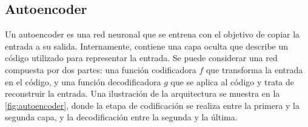 \subsection{Autoencoder}\label{sec:autoencoder}

Un autoencoder es una red neuronal que se entrena con el objetivo de copiar la entrada a su salida. Internamente, contiene una capa oculta que describe un código utilizado para representar la entrada. Se puede considerar una red compuesta por dos partes: una función codificadora $f$ que transforma la entrada en el código, y una función decodificadora $g$ que se aplica al código y trata de reconstruir la entrada. Una ilustración de la arquitectura se muestra en la \autoref{fig:autoencoder}, donde la etapa de codificación se realiza entre la primera y la segunda capa, y la decodificación entre la segunda y la última.

